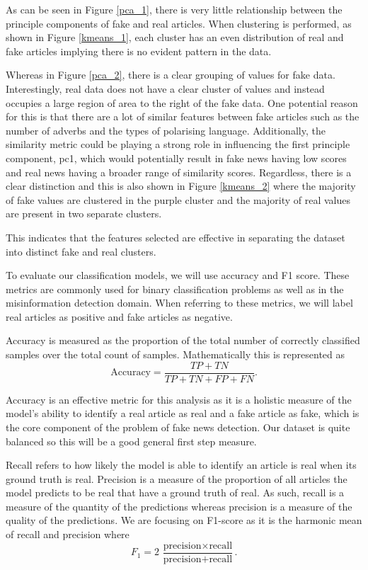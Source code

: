\documentclass{article}
\begin{document}
As can be seen in Figure \ref{pca_1}, there is very little relationship between the principle components of fake and real articles. When clustering is performed, as shown in Figure \ref{kmeans_1}, each cluster has an even distribution of real and fake articles implying there is no evident pattern in the data.

Whereas in Figure \ref{pca_2}, there is a clear grouping of values for fake data. Interestingly, real data does not have a clear cluster of values and instead occupies a large region of area to the right of the fake data. One potential reason for this is that there are a lot of similar features between fake articles such as the number of adverbs and the types of polarising language. Additionally, the similarity metric could be playing a strong role in influencing the first principle component, pc1, which would potentially result in fake news having low scores and real news having a broader range of similarity scores. Regardless, there is a clear distinction and this is also shown in Figure \ref{kmeans_2} where the majority of fake values are clustered in the purple cluster and the majority of real values are present in two separate clusters.

This indicates that the features selected are effective in separating the dataset into distinct fake and real clusters.

\label{section:eval}

To evaluate our classification models, we will use accuracy and F1 score. These metrics are commonly used for binary classification problems as well as in the misinformation detection domain. When referring to these metrics, we will label real articles as positive and fake articles as negative.

Accuracy is measured as the proportion of the total number of correctly classified samples over the total count of samples. Mathematically this is represented as
$$\text{Accuracy} = \frac{TP + TN}{TP + TN + FP + FN}.$$

Accuracy is an effective metric for this analysis as it is a holistic measure of the model's ability to identify a real article as real and a fake article as fake, which is the core component of the problem of fake news detection.
Our dataset is quite balanced so this will be a good general first step measure.

Recall refers to how likely the model is able to identify an article is real when its ground truth is real. Precision is a measure of the proportion of all articles the model predicts to be real that have a ground truth of real. As such, recall is a measure of the quantity of the predictions whereas precision is a measure of the quality of the predictions. We are focusing on F1-score as it is the harmonic mean of recall and precision where
$$F_1 = 2\,\frac{\text{precision}\times\text{recall}}{\text{precision}+\text{recall}}.$$
\end{document}
